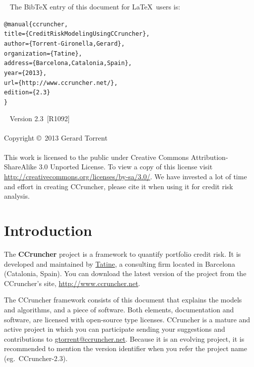 \documentclass[11pt,fleqn]{book} %
\def\numversion{2.3}
\def\svnversion{R1092}
\begin{document}
~\vfill
The BibTeX entry of this document for \LaTeX\ users is:
\begin{alltt}
@manual\{ccruncher,
    title = \{Credit Risk Modeling Using CCruncher\},
    author = \{Torrent-Gironella, Gerard\},
    organization = \{Tatine\},
    address = \{Barcelona, Catalonia, Spain\},
    year = \{2013\},
    url = \{http://www.ccruncher.net/\},
    edition = \{\numversion\}
\}
\end{alltt}

~\vfill
\thispagestyle{empty}
\noindent Version \numversion\ [\svnversion]\\ 
\\
\noindent Copyright \copyright\ 2013 Gerard Torrent\\
\\
\noindent 
This work is licensed to the public under Creative Commons 
Attribution-ShareAlike 3.0 Unported License. To view a copy 
of this license visit 
\url{http://creativecommons.org/licenses/by-sa/3.0/}.
We have invested a lot of time and effort in creating CCruncher, 
please cite it when using it for credit risk analysis.


\pagestyle{empty}
\setcounter{tocdepth}{1}
\tableofcontents
\cleardoublepage
\pagestyle{fancy}


\chapter{Introduction}

The \textbf{CCruncher} project is a framework to quantify portfolio credit 
risk. It is developed and maintained by \href{http://www.tatine.es}{Tatine}, 
a consulting firm located in Barcelona (Catalonia, Spain). You can download 
the latest version of the project from the CCruncher's site, 
\url{http://www.ccruncher.net}.

The CCruncher framework consists of this document that explains the models 
and algorithms, and a piece of software. Both elements, documentation and 
software, are licensed with open-source type licenses. CCruncher is a mature 
and active project in which you can participate sending your suggestions and 
contributions to \href{mailto:gtorrent@ccruncher.net}{gtorrent@ccruncher.net}.
Because it is an evolving project, it is recommended to mention the version
identifier when you refer the project name (eg.\ CCruncher-\numversion).
\end{document}
